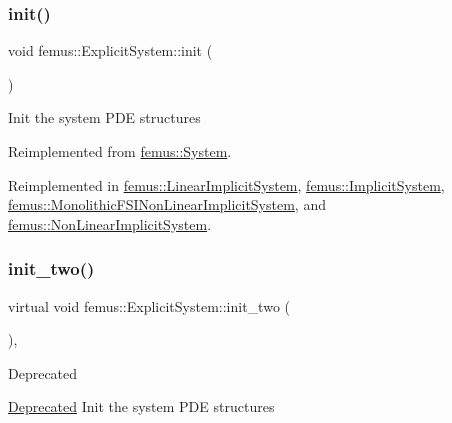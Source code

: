 \subsubsection{\texorpdfstring{init()}{init()}}
{\footnotesize\ttfamily void femus\+::\+Explicit\+System\+::init (\begin{DoxyParamCaption}{ }\end{DoxyParamCaption})\hspace{0.3cm}{\ttfamily [virtual]}}

Init the system P\+DE structures 

Reimplemented from \mbox{\hyperlink{classfemus_1_1_system_a1defaa9e59d3aa2ac62aa7fa111b6e32}{femus\+::\+System}}.



Reimplemented in \mbox{\hyperlink{classfemus_1_1_linear_implicit_system_a4605bac9ea670bb7dbd4454358155670}{femus\+::\+Linear\+Implicit\+System}}, \mbox{\hyperlink{classfemus_1_1_implicit_system_a098b8d66e167a03759ca089bf0f0dc11}{femus\+::\+Implicit\+System}}, \mbox{\hyperlink{classfemus_1_1_monolithic_f_s_i_non_linear_implicit_system_a07e04a8cce138cae9edcdd05fd1c7829}{femus\+::\+Monolithic\+F\+S\+I\+Non\+Linear\+Implicit\+System}}, and \mbox{\hyperlink{classfemus_1_1_non_linear_implicit_system_ad2d20975e0c919a9d99bdd9368a0212a}{femus\+::\+Non\+Linear\+Implicit\+System}}.

\mbox{\label{classfemus_1_1_explicit_system_a149e74ccad300a58b25f72a6b0439f2b}} 
\subsubsection{\texorpdfstring{init\+\_\+two()}{init\_two()}}
{\footnotesize\ttfamily virtual void femus\+::\+Explicit\+System\+::init\+\_\+two (\begin{DoxyParamCaption}{ }\end{DoxyParamCaption})\hspace{0.3cm}{\ttfamily [inline]}, {\ttfamily [virtual]}}

\begin{DoxyRefDesc}{Deprecated}
\item[\mbox{\hyperlink{deprecated__deprecated000008}{Deprecated}}]Init the system P\+DE structures \end{DoxyRefDesc}


